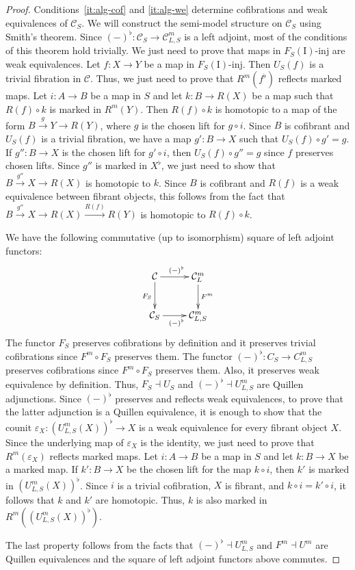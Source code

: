 \documentclass[reqno]{amsart}
\theoremstyle{definition}
\theoremstyle{remark}
\newcommand{\fs}[1]{\mathrm{#1}}
\newcommand{\cat}[1]{\mathcal{#1}}
\newcommand{\C}{\cat{C}}
\newcommand{\I}{\fs{I}}
\newcommand{\class}[2]{#1\text{-}\mathrm{#2}}
\newcommand{\Iinj}[1][\I]{\class{#1}{inj}}
\numberwithin{figure}{section}
\begin{document}
\begin{proof}
Conditions~\eqref{it:alg-cof} and \eqref{it:alg-we} determine cofibrations and weak equivalences of $\C_S$.
We will construct the semi-model structure on $\C_S$ using Smith's theorem.
Since $(-)^\flat : \C_S \to \C^m_{L,S}$ is a left adjoint, most of the conditions of this theorem hold trivially.
We just need to prove that maps in $\Iinj[F_S(\I)]$ are weak equivalences.
Let $f : X \to Y$ be a map in $\Iinj[F_S(\I)]$.
Then $U_S(f)$ is a trivial fibration in $\C$.
Thus, we just need to prove that $R^m(f^\flat)$ reflects marked maps.
Let $i : A \to B$ be a map in $S$ and let $k : B \to R(X)$ be a map such that $R(f) \circ k$ is marked in $R^m(Y)$.
Then $R(f) \circ k$ is homotopic to a map of the form $B \xrightarrow{g} Y \to R(Y)$, where $g$ is the chosen lift for $g \circ i$.
Since $B$ is cofibrant and $U_S(f)$ is a trivial fibration, we have a map $g' : B \to X$ such that $U_S(f) \circ g' = g$.
If $g'' : B \to X$ is the chosen lift for $g' \circ i$, then $U_S(f) \circ g'' = g$ since $f$ preserves chosen lifts.
Since $g''$ is marked in $X^\flat$, we just need to show that $B \xrightarrow{g''} X \to R(X)$ is homotopic to $k$.
Since $B$ is cofibrant and $R(f)$ is a weak equivalence between fibrant objects, this follows from the fact that $B \xrightarrow{g''} X \to R(X) \xrightarrow{R(f)} R(Y)$ is homotopic to $R(f) \circ k$.

We have the following commutative (up to isomorphism) square of left adjoint functors:
\[ \xymatrix{ \C \ar[r]^{(-)^\flat} \ar[d]_{F_S} & \C^m_L \ar[d]^{F^m} \\
              \C_S \ar[r]_{(-)^\flat}            & \C^m_{L,S}
            } \]
The functor $F_S$ preserves cofibrations by definition and it preserves trivial cofibrations since $F^m \circ F_S$ preserves them.
The functor $(-)^\flat : C_S \to C^m_{L,S}$ preserves cofibrations since $F^m \circ F_S$ preserves them.
Also, it preserves weak equivalence by definition.
Thus, $F_S \dashv U_S$ and $(-)^\flat \dashv U^m_{L,S}$ are Quillen adjunctions.
Since $(-)^\flat$ preserves and reflects weak equivalences, to prove that the latter adjunction is a Quillen equivalence, it is enough to show that the counit $\varepsilon_X : (U^m_{L,S}(X))^\flat \to X$ is a weak equivalence for every fibrant object $X$.
Since the underlying map of $\varepsilon_X$ is the identity, we just need to prove that $R^m(\varepsilon_X)$ reflects marked maps.
Let $i : A \to B$ be a map in $S$ and let $k : B \to X$ be a marked map.
If $k' : B \to X$ be the chosen lift for the map $k \circ i$, then $k'$ is marked in $(U^m_{L,S}(X))^\flat$.
Since $i$ is a trivial cofibration, $X$ is fibrant, and $k \circ i = k' \circ i$, it follows that $k$ and $k'$ are homotopic.
Thus, $k$ is also marked in $R^m((U^m_{L,S}(X))^\flat)$.

The last property follows from the facts that $(-)^\flat \dashv U^m_{L,S}$ and $F^m \dashv U^m$ are Quillen equivalences and the square of left adjoint functors above commutes.
\end{proof}
\end{document}
